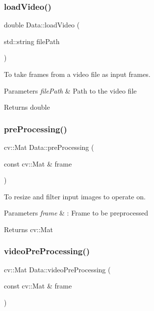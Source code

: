 \subsubsection{\texorpdfstring{load\+Video()}{loadVideo()}}
{\footnotesize\ttfamily double Data\+::load\+Video (\begin{DoxyParamCaption}\item[{std\+::string}]{file\+Path }\end{DoxyParamCaption})}



To take frames from a video file as input frames. 


\begin{DoxyParams}{Parameters}
{\em file\+Path} & Path to the video file \\
\hline
\end{DoxyParams}
\begin{DoxyReturn}{Returns}
double 
\end{DoxyReturn}
\mbox{\label{classData_a8791dd62b1f57b4e4f2039e934ec7fdf}} 
\subsubsection{\texorpdfstring{pre\+Processing()}{preProcessing()}}
{\footnotesize\ttfamily cv\+::\+Mat Data\+::pre\+Processing (\begin{DoxyParamCaption}\item[{const cv\+::\+Mat \&}]{frame }\end{DoxyParamCaption})}



To resize and filter input images to operate on. 


\begin{DoxyParams}{Parameters}
{\em frame} & \+: Frame to be preprocessed \\
\hline
\end{DoxyParams}
\begin{DoxyReturn}{Returns}
cv\+::\+Mat 
\end{DoxyReturn}
\mbox{\label{classData_ab0eefc277a688a36ec7bef63e8807bc2}} 
\subsubsection{\texorpdfstring{video\+Pre\+Processing()}{videoPreProcessing()}}
{\footnotesize\ttfamily cv\+::\+Mat Data\+::video\+Pre\+Processing (\begin{DoxyParamCaption}\item[{const cv\+::\+Mat \&}]{frame }\end{DoxyParamCaption})}




